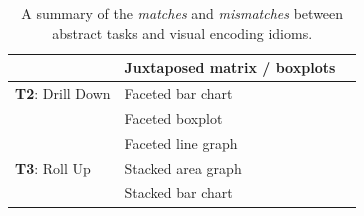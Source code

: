 \documentclass[journal]{vgtc}                %
\newcommand*\match{\textcolor{darkGreen}{\ding{52}}}
\newcommand*\mismatch{\textcolor{red}{\ding{54}}}
\begin{document}
\begin{table}[ht]
\begin{center}
\begin{tabular}{l|l|c}
        \rowcolor{gray!15}
        
        
        & Juxtaposed matrix / boxplots 
        
        & \match
        
        \\
        
        
        \hline
        
        
        {\bf T2}: Drill Down 
        
        & Faceted bar chart 
        
        & \match
        
        \\
        
        \rowcolor{gray!15}
        
        
        & Faceted boxplot 
        
        & \mismatch
        
        \\
        
        
        & Faceted line graph 
        
        & \match
        
        \\
        
        \rowcolor{gray!15}
        
        \hline
        
        {\bf T3}: Roll Up 
        
        & Stacked area graph 
        
        & \match
        
        \\
        
        
        & Stacked bar chart 
        
        & \match
        
        \\
        
        \hline  
        
    \end{tabular}
    \vspace{-0.3cm}
    \caption{A summary of the \textsl{matches} and \textsl{mismatches} between abstract tasks and visual encoding idioms.}
    \label{tab:matches-mismatches}
    \end{center}
    \vspace{-0.9cm}
\end{table}
\end{document}
